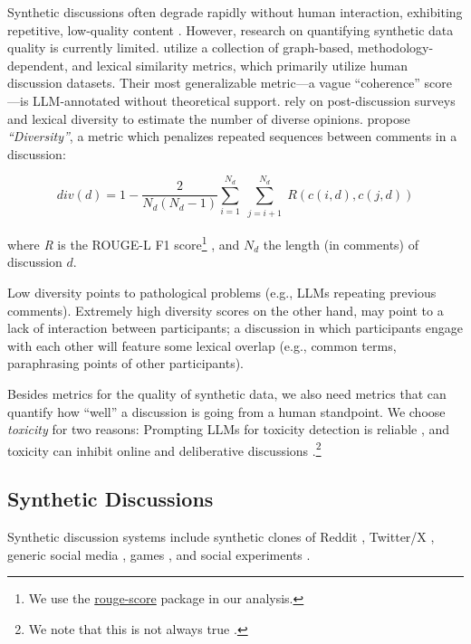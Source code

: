 Synthetic discussions often degrade rapidly without human interaction, exhibiting repetitive, low-quality content \citep{ulmer2024}. However, research on quantifying synthetic data quality is currently limited. \citet{balog_2024} utilize a collection of graph-based, methodology-dependent, and lexical similarity metrics, which primarily utilize human discussion datasets. Their most generalizable metric—a vague ``coherence'' score—is \ac{LLM}-annotated without theoretical support. \citet{kim_et_al_chatbot} rely on post-discussion surveys and lexical diversity to estimate the number of diverse opinions. \citet{ulmer2024} propose \emph{``Diversity''}, a metric which penalizes repeated sequences between comments in a discussion:

\small
\begin{equation}
\label{eq:variety}
    \textit{div}(d) = 1 - \frac{2}{N_d(N_d-1)}
\sum_{i=1}^{N_d} \sum_{\substack{j=i+1}}^{N_d} R(c(i,d), c(j,d))
\end{equation}
\normalsize

\noindent where \textit{R} is the ROUGE-L F1 score\footnote{We use the \href{https://pypi.org/project/rouge-score}{rouge-score} package in our analysis.} \cite{lin-2004-rouge}, and $N_d$ the length (in comments) of discussion $d$.

Low diversity points to pathological problems (e.g., \acp{LLM} repeating previous comments). Extremely high diversity scores on the other hand, may point to a lack of interaction between participants; a discussion in which participants engage with each other will feature some lexical overlap (e.g., common terms, paraphrasing points of other participants).

Besides metrics for the quality of synthetic data, we also need metrics that can quantify how ``well'' a discussion is going from a human standpoint. We choose \emph{toxicity} for two reasons: Prompting \acp{LLM} for toxicity detection is reliable \citep{kang-qian-2024-implanting, Wang2022ToxicityDW, anjum2024hate}, and toxicity can inhibit online and deliberative discussions \citep{dekock2022disagree, XiaToxicity}.\footnote{We note that this is not always true \citep{Avalle2024PersistentIP}.}


\subsection{Synthetic Discussions}
\label{ssec:related:discussions}

Synthetic discussion systems include synthetic clones of Reddit \cite{park_simulacra}, Twitter/X \cite{mou_2024}, generic social media \cite{tornberg_2023, y_social}, games \cite{Park2023GenerativeAI}, and social experiments \cite{zhou_2024_sotopia}.

